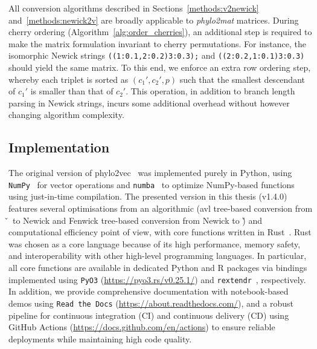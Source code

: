 All conversion algorithms described in Sections~\ref{methods:v2newick} and~\ref{methods:newick2v} are broadly applicable to \emph{phylo2mat} matrices. During cherry ordering (Algorithm~\ref{alg:order_cherries}), an additional step is required to make the matrix formulation invariant to cherry permutations. \newline For instance, the isomorphic Newick strings \texttt{((1:0.1,2:0.2)3:0.3);} and \texttt{((2:0.2,1:0.1)3:0.3)} should yield the same matrix. To this end, we enforce an extra row ordering step, whereby each triplet is sorted as $(c_1', c_2', p)$ such that the smallest descendant of $c_1'$ is smaller than that of $c_2'$. This operation, in addition to branch length parsing in Newick strings, incurs some additional overhead without however changing algorithm complexity.



\subsection{Implementation}

The original version of phylo2vec~\cite{penn2025} was implemented purely in Python, using \texttt{NumPy}~\cite{harris2020} for vector operations and \texttt{numba}~\cite{lam2015} to optimize NumPy-based functions using just-in-time compilation. The presented version in this thesis (v1.4.0)~\cite{scheidwasser2025} features several optimisations from an algorithmic (\gls{avl} tree-based conversion from \v~to Newick and Fenwick tree-based conversion from Newick to \v) and computational efficiency point of view, with core functions written in Rust~\cite{rust}. Rust was chosen as a core language because of its high performance, memory safety, and interoperability with other high-level programming languages. In particular, all core functions are available in dedicated Python and R packages via bindings implemented using \texttt{PyO3} (\url{https://pyo3.rs/v0.25.1/}) and \texttt{rextendr}~\cite{wilke2025}, respectively. In addition, we provide comprehensive documentation with notebook-based demos using \texttt{Read the Docs} (\url{https://about.readthedocs.com/}), and a robust pipeline for continuous integration (CI) and continuous delivery (CD) using GitHub Actions (\url{https://docs.github.com/en/actions}) to ensure reliable deployments while maintaining high code quality.


